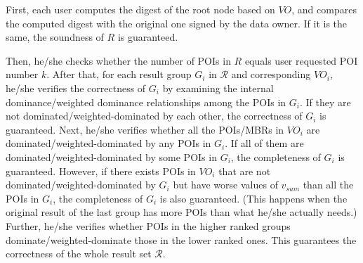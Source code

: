 \documentclass[10pt, conference, compsocconf]{IEEEtran}
\begin{document}
First, each user computes the digest of the root node based on $VO$, and compares the computed digest with the original one signed by the data owner. If it is the same, the soundness of $R$ is guaranteed.

Then, he/she checks whether the number of POIs in $R$ equals user requested POI number $k$. After that, for each result group $G_i$ in $\mathcal{R}$ and corresponding $VO_i$, he/she verifies the correctness of $G_i$ by examining the internal dominance/weighted dominance relationships among the POIs in $G_i$. If they are not dominated/weighted-dominated by each other, the correctness of $G_i$ is guaranteed. Next, he/she verifies whether all the POIs/MBRs in $VO_i$ are dominated/weighted-dominated by any POIs in $G_i$. If all of them are dominated/weighted-dominated by some POIs in $G_i$, the completeness of $G_i$ is guaranteed. However, if there exists POIs in $VO_i$ that are not dominated/weighted-dominated by $G_i$ but have worse values of $v_{sum}$ than all the POIs in $G_i$, the completeness of $G_i$ is also guaranteed. (This happens when the original result of the last group has more POIs than what he/she actually needs.) Further, he/she verifies whether POIs in the higher ranked groups dominate/weighted-dominate those in the lower ranked ones. This guarantees the correctness of the whole result set $\mathcal{R}$.


% 
% 
\end{document}
